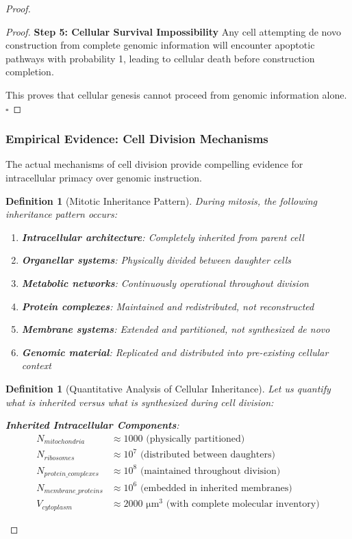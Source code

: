 \documentclass[12pt,a4paper]{article}
\newtheorem{definition}[theorem]{Definition}
\begin{document}
\begin{proof}
\begin{proof}
\textbf{Step 5: Cellular Survival Impossibility}
Any cell attempting de novo construction from complete genomic information will encounter apoptotic pathways with probability 1, leading to cellular death before construction completion.

This proves that cellular genesis cannot proceed from genomic information alone. $\square$
\end{proof}

\subsubsection{Empirical Evidence: Cell Division Mechanisms}

The actual mechanisms of cell division provide compelling evidence for intracellular primacy over genomic instruction.

\begin{definition}[Mitotic Inheritance Pattern]
During mitosis, the following inheritance pattern occurs:
\begin{enumerate}
\item \textbf{Intracellular architecture}: Completely inherited from parent cell
\item \textbf{Organellar systems}: Physically divided between daughter cells
\item \textbf{Metabolic networks}: Continuously operational throughout division
\item \textbf{Protein complexes}: Maintained and redistributed, not reconstructed
\item \textbf{Membrane systems}: Extended and partitioned, not synthesized de novo
\item \textbf{Genomic material}: Replicated and distributed into pre-existing cellular context
\end{enumerate}
\end{definition}

\begin{definition}[Quantitative Analysis of Cellular Inheritance]
Let us quantify what is inherited versus what is synthesized during cell division:

\textbf{Inherited Intracellular Components}:
\begin{align}
N_{mitochondria} &\approx 1000 \text{ (physically partitioned)} \\
N_{ribosomes} &\approx 10^7 \text{ (distributed between daughters)} \\
N_{protein\_complexes} &\approx 10^8 \text{ (maintained throughout division)} \\
N_{membrane\_proteins} &\approx 10^6 \text{ (embedded in inherited membranes)} \\
V_{cytoplasm} &\approx 2000 \text{ μm}^3 \text{ (with complete molecular inventory)}
\end{align}


\end{definition}
\end{proof}
\end{document}

